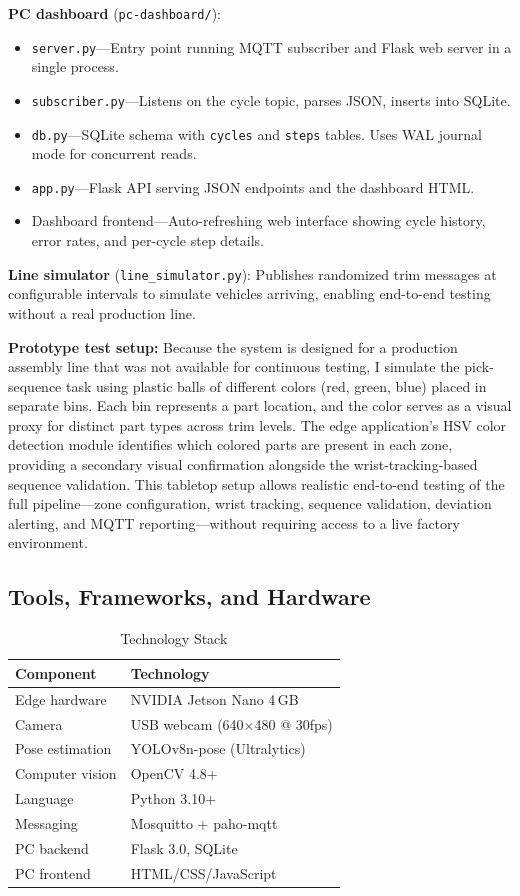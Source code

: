 \documentclass[conference]{IEEEtran}
\begin{document}
\textbf{PC dashboard} (\texttt{pc-dashboard/}):
\begin{itemize}
    \item \texttt{server.py}---Entry point running MQTT subscriber and Flask web server in a single process.
    \item \texttt{subscriber.py}---Listens on the cycle topic, parses JSON, inserts into SQLite.
    \item \texttt{db.py}---SQLite schema with \texttt{cycles} and \texttt{steps} tables. Uses WAL journal mode for concurrent reads.
    \item \texttt{app.py}---Flask API serving JSON endpoints and the dashboard HTML.
    \item Dashboard frontend---Auto-refreshing web interface showing cycle history, error rates, and per-cycle step details.
\end{itemize}

\textbf{Line simulator} (\texttt{line\_simulator.py}): Publishes randomized trim messages at configurable intervals to simulate vehicles arriving, enabling end-to-end testing without a real production line.

\textbf{Prototype test setup:} Because the system is designed for a production assembly line that was not available for continuous testing, I simulate the pick-sequence task using plastic balls of different colors (red, green, blue) placed in separate bins. Each bin represents a part location, and the color serves as a visual proxy for distinct part types across trim levels. The edge application's HSV color detection module identifies which colored parts are present in each zone, providing a secondary visual confirmation alongside the wrist-tracking-based sequence validation. This tabletop setup allows realistic end-to-end testing of the full pipeline---zone configuration, wrist tracking, sequence validation, deviation alerting, and MQTT reporting---without requiring access to a live factory environment.

\subsection{Tools, Frameworks, and Hardware}

\begin{table}[htbp]
\caption{Technology Stack}
\label{tab:techstack}
\centering
\begin{tabular}{ll}
\toprule
\textbf{Component} & \textbf{Technology} \\
\midrule
Edge hardware & NVIDIA Jetson Nano 4\,GB \\
Camera & USB webcam (640$\times$480 @ 30fps) \\
Pose estimation & YOLOv8n-pose (Ultralytics) \\
Computer vision & OpenCV 4.8+ \\
Language & Python 3.10+ \\
Messaging & Mosquitto + paho-mqtt \\
PC backend & Flask 3.0, SQLite \\
PC frontend & HTML/CSS/JavaScript \\
\bottomrule
\end{tabular}
\end{table}
\end{document}
